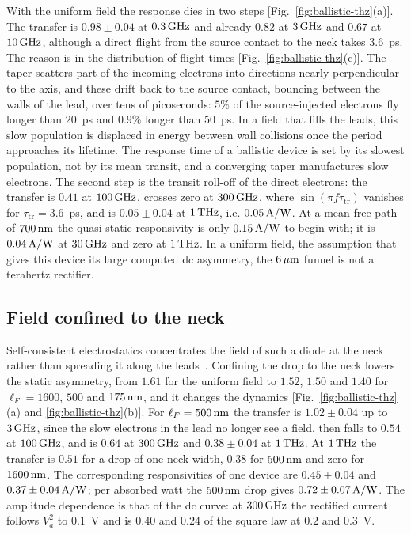 With the uniform field the response dies in two steps
[Fig.~\ref{fig:ballistic-thz}(a)]. The transfer is $0.98\pm0.04$ at
$0.3\,\mathrm{GHz}$ and already $0.82$ at $3\,\mathrm{GHz}$ and $0.67$ at $10\,\mathrm{GHz}$, although a
direct flight from the source contact to the neck takes $3.6$~ps. The
reason is in the distribution of flight times
[Fig.~\ref{fig:ballistic-thz}(c)]. The taper scatters part of the incoming
electrons into directions nearly perpendicular to the axis, and these drift
back to the source contact, bouncing between the walls of the lead, over
tens of picoseconds: $5\%$ of the source-injected electrons fly longer than
$20$~ps and $0.9\%$ longer than $50$~ps. In a field that fills the leads,
this slow population is displaced in energy between wall collisions once
the period approaches its lifetime. The response time of a ballistic device is set by its slowest
population, not by its mean transit, and a converging taper manufactures
slow electrons. The second step is the transit roll-off of the direct
electrons: the transfer is $0.41$ at $100\,\mathrm{GHz}$, crosses zero at $300\,\mathrm{GHz}$,
where $\sin(\pi f\tau_{\mathrm{tr}})$ vanishes for
$\tau_{\mathrm{tr}}=3.6$~ps, and is $0.05\pm0.04$ at $1\,\mathrm{THz}$, i.e.
$0.05\,\mathrm{A/W}$. At a mean free path of $700\,\mathrm{nm}$ the quasi-static responsivity is
only $0.15\,\mathrm{A/W}$ to begin with; it is $0.04\,\mathrm{A/W}$ at $30\,\mathrm{GHz}$ and zero at
$1\,\mathrm{THz}$. In a uniform field, the assumption that gives this device its
large computed dc asymmetry, the $6\,\mu\mathrm{m}$ funnel is not
a terahertz rectifier.

\subsection{Field confined to the neck}

Self-consistent electrostatics concentrates the field of such a diode at
the neck rather than spreading it along the
leads~\cite{truccolo2024comprehensive}. Confining the drop to the
neck lowers the static asymmetry, from $1.61$ for the uniform field to
$1.52$, $1.50$ and $1.40$ for $\ell_{F}=1600$, $500$ and $175\,\mathrm{nm}$, and it
changes the dynamics [Fig.~\ref{fig:ballistic-thz}(a) and
\ref{fig:ballistic-thz}(b)]. For $\ell_{F}=500\,\mathrm{nm}$ the transfer is
$1.02\pm0.04$ up to $3\,\mathrm{GHz}$, since the slow electrons in the lead no
longer see a field, then falls to $0.54$ at $100\,\mathrm{GHz}$, and is $0.64$ at
$300\,\mathrm{GHz}$ and $0.38\pm0.04$ at $1\,\mathrm{THz}$. At
$1\,\mathrm{THz}$ the transfer is $0.51$ for a drop of one neck width, $0.38$ for
$500\,\mathrm{nm}$ and zero for $1600\,\mathrm{nm}$. The corresponding responsivities of one device are
$0.45\pm0.04$ and $0.37\pm0.04\,\mathrm{A/W}$; per absorbed
watt the $500\,\mathrm{nm}$ drop gives $0.72\pm0.07\,\mathrm{A/W}$. The
amplitude dependence is that of the dc curve: at $300\,\mathrm{GHz}$ the rectified
current follows $V_{a}^{2}$ to $0.1$~V and is $0.40$ and $0.24$ of the
square law at $0.2$ and $0.3$~V.

